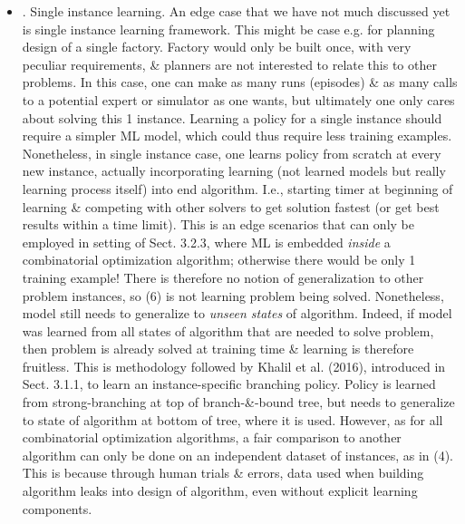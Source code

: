 \documentclass{article}
\begin{document}
\begin{itemize}
\begin{itemize}
        \item {. Single instance learning.} An edge case that we have not much discussed yet is single instance learning framework. This might be case e.g. for planning design of a single factory. Factory would only be built once, with very peculiar requirements, \& planners are not interested to relate this to other problems. In this case, one can make as many runs (episodes) \& as many calls to a potential expert or simulator as one wants, but ultimately one only cares about solving this 1 instance. Learning a policy for a single instance should require a simpler ML model, which could thus require less training examples. Nonetheless, in single instance case, one learns policy from scratch at every new instance, actually incorporating learning (not learned models but really learning process itself) into end algorithm. I.e., starting timer at beginning of learning \& competing with other solvers to get solution fastest (or get best results within a time limit). This is an edge scenarios that can only be employed in setting of Sect. 3.2.3, where ML is embedded {\it inside} a combinatorial optimization algorithm; otherwise there would be only 1 training example! There is therefore no notion of generalization to other problem instances, so (6) is not learning problem being solved. Nonetheless, model still needs to generalize to {\it unseen states} of algorithm. Indeed, if model was learned from all states of algorithm that are needed to solve problem, then problem is already solved at training time \& learning is therefore fruitless. This is methodology followed by Khalil et al. (2016), introduced in Sect. 3.1.1, to learn an instance-specific branching policy. Policy is learned from strong-branching at top of branch-\&-bound tree, but needs to generalize to state of algorithm at bottom of tree, where it is used. However, as for all combinatorial optimization algorithms, a fair comparison to another algorithm can only be done on an independent dataset of instances, as in (4). This is because through human trials \& errors, data used when building algorithm leaks into design of algorithm, even without explicit learning components.


\end{itemize}
\end{itemize}
\end{document}
